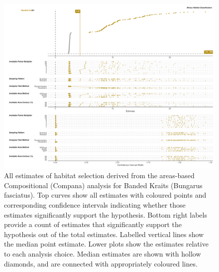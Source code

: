 \documentclass[10pt,a4paper]{article}
\begin{document}
\begin{figure}
\includegraphics[width=1\linewidth]{../../figures/specCurve_Banded Krait_area} \caption{All estimates of habitat selection derived from the areas-based Compositional (Compana) analysis for Banded Kraits (Bungarus fasciatus). Top curves show all estimates with coloured points and corresponding confidence intervals indicating whether those estimates significantly support the hypothesis. Bottom right labels provide a count of estimates that significantly support the hypothesis out of the total estimates. Labelled vertical lines show the median point estimate. Lower plots show the estimates relative to each analysis choice. Median estimates are shown with hollow diamonds, and are connected with appropriately coloured lines.}\label{fig:specCurveAreaBUFA}
\end{figure}
\end{document}
